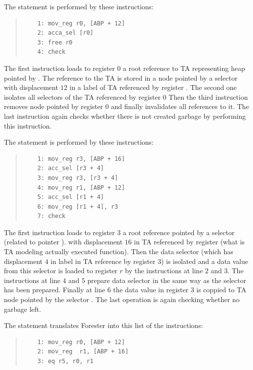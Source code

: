\bexmp
	The statement  is performed by these instructions:
	\begin{quote}
	\begin{verbatim}
	1: mov_reg r0, [ABP + 12]
	2: acca_sel [r0]
	3: free r0
	4: check
	\end{verbatim}
	\end{quote}

	The first instruction loads to register $0$ a root reference to TA representing heap pointed by .
	The reference to the TA is stored in a node pointed by a selector with displacement $12$
	in a label of TA referenced by register .
	The second one isolates all selectors of the TA referenced by register $0$
	Then the third instruction removes node pointed by register $0$
	and finally invalidates all references to it.
	The last instruction again checks whether there is not created garbage by performing this instruction.

\eexmp

\bexmp
	The statement  is performed by these instructions:
	\begin{quote}
	\begin{verbatim}
	1: mov_reg r3, [ABP + 16]
	2: acc_sel [r3 + 4]
	3: mov_reg r3, [r3 + 4]
	4: mov_reg r1, [ABP + 12]
	5: acc_sel [r1 + 4]
	6: mov_reg [r1 + 4], r3
	7: check
	\end{verbatim}
	\end{quote}

	The first instruction loads to register $3$ a root reference pointed by a selector (related to pointer ).
	with displacement $16$ in TA referenced by register  (what is TA modeling actually executed function).
	Then the data selector  (which has displacement $4$ in label in TA reference by register $3$)
	is isolated and a data value from this selector	is loaded to register $r$ by the instructions at line $2$ and $3$.
	The instructions at line $4$ and $5$ prepare data selector  in the same way
	as the selector  has been prepared.
	Finally at line $6$ the data value in register $3$ is coppied to TA node pointed by
	the selector .
	The last operation is again checking whether no garbage left.
\eexmp

\bexmp
	The statement  translates Forester into this list of the instructions:
	\begin{quote}
	\begin{verbatim}
	1: mov_reg r0, [ABP + 12]
	2: mov_reg	r1, [ABP + 16]
	3: eq r5, r0, r1
	\end{verbatim}
	\end{quote}

